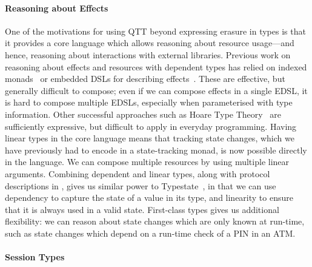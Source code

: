 \paragraph*{Reasoning about Effects}

One of the motivations for using QTT beyond expressing erasure in types is
that it provides a core language which allows reasoning about resource
usage---and hence, reasoning about interactions with external libraries.
Previous work on reasoning about effects and resources with dependent types
has relied on indexed monads~\cite{Atkey2009,McBride2011} or embedded DSLs
for describing effects~\cite{brady-tfp14}. These are effective, but
generally difficult to compose; even if we can compose effects in a
single EDSL, it is hard to compose multiple EDSLs, especially when
parameterised with type information. Other successful approaches
such as Hoare Type Theory~\cite{Ynot2008} are sufficiently expressive, but
difficult to apply in everyday programming. Having linear types in the core
language means that tracking state changes, which we have previously had to
encode in a state-tracking monad, is now possible directly in the language. We
can compose multiple resources by using multiple linear arguments.
Combining dependent and linear types, along with protocol descriptions in
, gives us similar power to
Typestate~\cite{typestate_2009,typestate_2014}, in that we can use dependency
to capture the state of a value in its type, and linearity to ensure that it is
always used in a valid state. First-class types gives us additional flexibility:
we can reason about state changes which are only known at run-time,
such as state changes which depend on a run-time check of a PIN in an ATM.



\paragraph*{Session Types}

